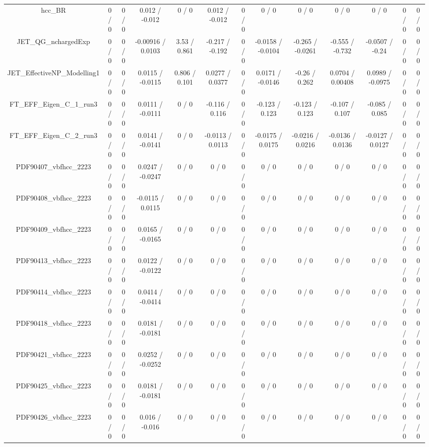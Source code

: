 \documentclass[10pt]{article}
\begin{document}
\begin{table}[htbp]
\begin{center}
\begin{tabular}{|c|c|c|c|c|c|c|c|c|c|c|c|c|}
  hcc_BR & 0 / 0 & 0 / 0 & 0.012 / -0.012 & 0 / 0 & 0.012 / -0.012 & 0 / 0 & 0 / 0 & 0 / 0 & 0 / 0 & 0 / 0 & 0 / 0 & 0 / 0 \\ 
  JET_QG_nchargedExp & 0 / 0 & 0 / 0 & -0.00916 / 0.0103 & 3.53 / 0.861 & -0.217 / -0.192 & 0 / 0 & -0.0158 / -0.0104 & -0.265 / -0.0261 & -0.555 / -0.732 & -0.0507 / -0.24 & 0 / 0 & 0 / 0 \\ 
  JET_EffectiveNP_Modelling1 & 0 / 0 & 0 / 0 & 0.0115 / -0.0115 & 0.806 / 0.101 & 0.0277 / 0.0377 & 0 / 0 & 0.0171 / -0.0146 & -0.26 / 0.262 & 0.0704 / 0.00408 & 0.0989 / -0.0975 & 0 / 0 & 0 / 0 \\ 
  FT_EFF_Eigen_C_1_run3 & 0 / 0 & 0 / 0 & 0.0111 / -0.0111 & 0 / 0 & -0.116 / 0.116 & 0 / 0 & -0.123 / 0.123 & -0.123 / 0.123 & -0.107 / 0.107 & -0.085 / 0.085 & 0 / 0 & 0 / 0 \\ 
  FT_EFF_Eigen_C_2_run3 & 0 / 0 & 0 / 0 & 0.0141 / -0.0141 & 0 / 0 & -0.0113 / 0.0113 & 0 / 0 & -0.0175 / 0.0175 & -0.0216 / 0.0216 & -0.0136 / 0.0136 & -0.0127 / 0.0127 & 0 / 0 & 0 / 0 \\ 
  PDF90407_vbfhcc_2223 & 0 / 0 & 0 / 0 & 0.0247 / -0.0247 & 0 / 0 & 0 / 0 & 0 / 0 & 0 / 0 & 0 / 0 & 0 / 0 & 0 / 0 & 0 / 0 & 0 / 0 \\ 
  PDF90408_vbfhcc_2223 & 0 / 0 & 0 / 0 & -0.0115 / 0.0115 & 0 / 0 & 0 / 0 & 0 / 0 & 0 / 0 & 0 / 0 & 0 / 0 & 0 / 0 & 0 / 0 & 0 / 0 \\ 
  PDF90409_vbfhcc_2223 & 0 / 0 & 0 / 0 & 0.0165 / -0.0165 & 0 / 0 & 0 / 0 & 0 / 0 & 0 / 0 & 0 / 0 & 0 / 0 & 0 / 0 & 0 / 0 & 0 / 0 \\ 
  PDF90413_vbfhcc_2223 & 0 / 0 & 0 / 0 & 0.0122 / -0.0122 & 0 / 0 & 0 / 0 & 0 / 0 & 0 / 0 & 0 / 0 & 0 / 0 & 0 / 0 & 0 / 0 & 0 / 0 \\ 
  PDF90414_vbfhcc_2223 & 0 / 0 & 0 / 0 & 0.0414 / -0.0414 & 0 / 0 & 0 / 0 & 0 / 0 & 0 / 0 & 0 / 0 & 0 / 0 & 0 / 0 & 0 / 0 & 0 / 0 \\ 
  PDF90418_vbfhcc_2223 & 0 / 0 & 0 / 0 & 0.0181 / -0.0181 & 0 / 0 & 0 / 0 & 0 / 0 & 0 / 0 & 0 / 0 & 0 / 0 & 0 / 0 & 0 / 0 & 0 / 0 \\ 
  PDF90421_vbfhcc_2223 & 0 / 0 & 0 / 0 & 0.0252 / -0.0252 & 0 / 0 & 0 / 0 & 0 / 0 & 0 / 0 & 0 / 0 & 0 / 0 & 0 / 0 & 0 / 0 & 0 / 0 \\ 
  PDF90425_vbfhcc_2223 & 0 / 0 & 0 / 0 & 0.0181 / -0.0181 & 0 / 0 & 0 / 0 & 0 / 0 & 0 / 0 & 0 / 0 & 0 / 0 & 0 / 0 & 0 / 0 & 0 / 0 \\ 
  PDF90426_vbfhcc_2223 & 0 / 0 & 0 / 0 & 0.016 / -0.016 & 0 / 0 & 0 / 0 & 0 / 0 & 0 / 0 & 0 / 0 & 0 / 0 & 0 / 0 & 0 / 0 & 0 / 0 \\ 

\end{tabular}
\end{center}
\end{table}
\end{document}
